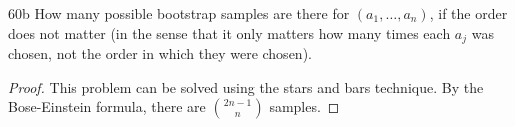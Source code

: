 \begin{exercise}{60b}
    How many possible bootstrap samples are there for $(a_1, \dots, a_n)$, if the order does not matter (in the sense that it only matters how many times each $a_j$ was chosen, not the order in which they were chosen).
\end{exercise}

\begin{proof}
    This problem can be solved using the stars and bars technique. By the Bose-Einstein formula, there are ${2n-1 \choose n}$ samples.
\end{proof}

